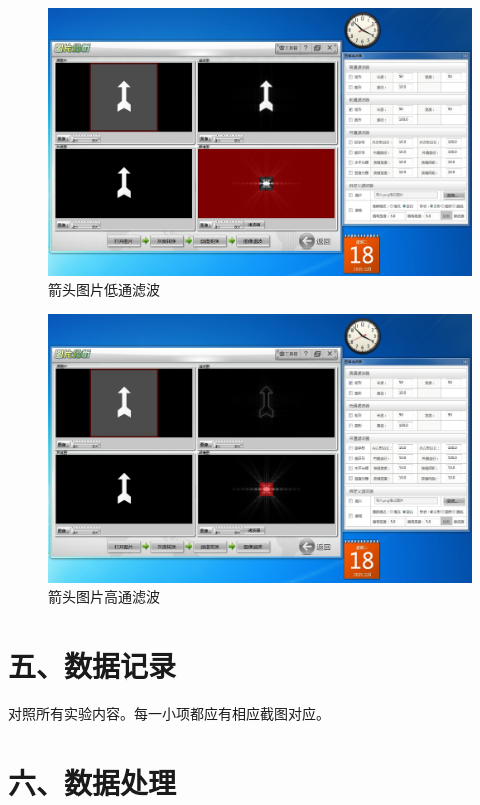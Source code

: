 \documentclass[11pt]{article}
\begin{document}
\begin{enumerate}
    \begin{figure}[H]
        \centering
        \includegraphics[width=15cm]{Fig/图21 箭头图片低通滤波.JPG}
        \caption{箭头图片低通滤波}
    \end{figure}
    \begin{figure}[H]
        \centering
        \includegraphics[width=15cm]{Fig/图22 箭头图片高通滤波.JPG}
        \caption{箭头图片高通滤波}
    \end{figure}

\end{enumerate}

\section*{五、数据记录}

对照所有实验内容。每一小项都应有相应截图对应。

\section*{六、数据处理}
\end{document}
